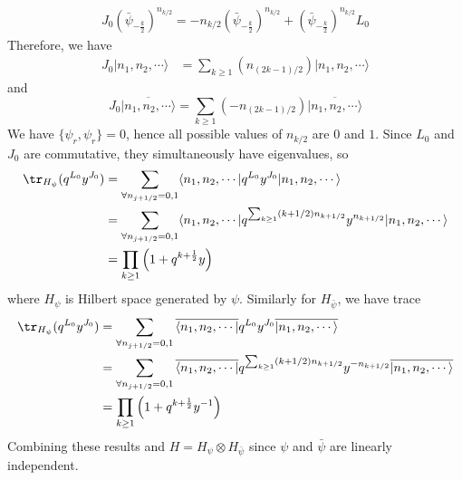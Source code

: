 \begin{equation}
\begin{split}
J_0 \left( \bar{\psi}_{-\frac{k}{2}} \right)^{n_{k/2}} =-n_{k/2} \left(\bar{\psi}_{-\frac{k}{2}} \right)^{n_{k/2}} + \left( \bar{\psi}_{-\frac{k}{2}} \right) ^{n_{k/2}}L_0	
\end{split}
\end{equation}
Therefore, we have
\begin{equation}
\begin{split}
J_0 |n_1,n_2,\cdots \rangle & = \sum_{k \geq 1} \left( n_{(2k-1)/2} \right)|n_1,n_2,\cdots \rangle
\end{split}
\end{equation}
and
\begin{equation}
J_0 \overline{|n_1,n_2, \cdots\rangle}= \sum_{k \geq 1} \left(-n_{(2k-1)/2} \right)\overline{|n_1,n_2,\cdots \rangle}
\end{equation}
We have $\{\psi_r, \psi_r\} =0$, hence all possible values of $n_{k/2}$ are $0$ and $1$. Since $L_0$ and $J_0$ are commutative, they simultaneously have eigenvalues, so
\begin{equation}
	\begin{split}
	\tr_{H_{\psi}}(q^{L_0} y^{J_0}) & = \sum_{\forall n_{j+1/2}=0,1}\langle n_1,n_2,\cdots | q^{L_0} y^{J_0} | n_1 ,n_2, \cdots \rangle \\
	& = \sum_{\forall  n_{j+1/2}=0,1} \langle n_1,n_2,\cdots | q^{\sum_{k \geq 1}(k+1/2)n_{k+1/2}} y^{n_{k+1/2}} | n_1,n_2 , \cdots \rangle\\
	& = \prod_{k \geq 1} \left( 1+ q^{k+\frac{1}{2}} y \right)
	\end{split}
\end{equation}
where $H_{\psi}$ is Hilbert space generated by $\psi$. Similarly for $H_{\bar{\psi}}$, we have trace
\begin{equation}
	\begin{split}
	\tr_{H_{\psi}}(q^{L_0} y^{J_0}) & = \sum_{\forall n_{j+1/2}=0,1}\overline{\langle n_1,n_2,\cdots |} q^{L_0} y^{J_0} \overline{| n_1 ,n_2, \cdots \rangle} \\
	& = \sum_{\forall  n_{j+1/2}=0,1} \overline{\langle n_1,n_2,\cdots |} q^{\sum_{k \geq 1}(k+1/2)n_{k+1/2}} y^{-n_{k+1/2}} \overline{| n_1,n_2 , \cdots \rangle}\\
	& = \prod_{k \geq 1} \left( 1+ q^{k+\frac{1}{2}} y^{-1} \right)
	\end{split}
\end{equation}
Combining these results and $H= H_{\psi } \otimes H_{\bar{\psi}}$ since $\psi$ and $\bar{\psi}$ are linearly independent.

